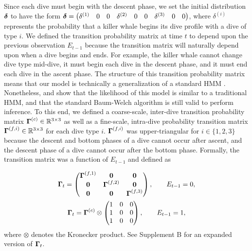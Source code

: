 Since each dive must begin with the descent phase, we set the initial distribution $\boldsymbol{\delta}$ to have the form $\boldsymbol{\delta} = \begin{pmatrix} \delta^{(1)} & 0 & 0 & \delta^{(2)} & 0 & 0 & \delta^{(3)} & 0 & 0 \end{pmatrix}$, where $\delta^{(i)}$ represents the probability that a killer whale begins its dive profile with a dive of type $i$. 
%
We defined the transition probability matrix at time $t$ to depend upon the previous observation $E_{t-1}$ because the transition matrix will naturally depend upon when a dive begins and ends. For example, the killer whale cannot change dive type mid-dive, it must begin each dive in the descent phase, and it must end each dive in the ascent phase. The structure of this transition probability matrix means that our model is technically a generalization of a standard HMM \citep[namely an HMMSDO,][]{Li:2005}. Nonetheless, \citet{Li:2005} and \citet{Tamposis:2018b} show that the likelihood of this model is similar to a traditional HMM, and that the standard Baum-Welch algorithm is still valid to perform inference. To this end, we defined a coarse-scale, inter-dive transition probability matrix $\boldsymbol{\Gamma}^{(c)} \in \mathbb{R}^{3 \times 3}$ as well as a fine-scale, intra-dive probability transition matrix $\boldsymbol{\Gamma}^{(f,i)} \in \mathbb{R}^{3 \times 3}$ for each dive type $i$. $\boldsymbol{\Gamma}^{(f,i)}$ was upper-triangular for $i \in \{1,2,3\}$ because the descent and bottom phases of a dive cannot occur after ascent, and the descent phase of a dive cannot occur after the bottom phase. Formally, the transition matrix was a function of $E_{t-1}$ and defined as

\begin{gather}
    \boldsymbol{\Gamma}_t = 
    \begin{pmatrix}
        \boldsymbol{\Gamma}^{(f,1)} & \mathbf{0} & \mathbf{0} \\
        \mathbf{0} & \boldsymbol{\Gamma}^{(f,2)} & \mathbf{0} \\
        \mathbf{0} & \mathbf{0} & \boldsymbol{\Gamma}^{(f,3)} \\
    \end{pmatrix}, \qquad E_{t-1} = 0, \\
    \boldsymbol{\Gamma}_t = \boldsymbol{\Gamma}^{(c)} \otimes \begin{pmatrix} 1 & 0 & 0 \\ 1 & 0 & 0 \\ 1 & 0 & 0 \end{pmatrix}, \qquad E_{t-1} = 1,
\end{gather}
%
where $\otimes$ denotes the Kronecker product. See Supplement B for an expanded version of $\boldsymbol{\Gamma}_t$.

